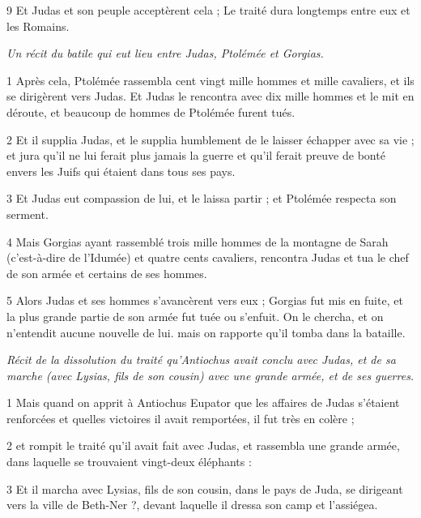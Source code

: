 \par 9 Et Judas et son peuple acceptèrent cela ; Le traité dura longtemps entre eux et les Romains.


\par \textit{Un récit du batile qui eut lieu entre Judas, Ptolémée et Gorgias.}

\par 1 Après cela, Ptolémée rassembla cent vingt mille hommes et mille cavaliers, et ils se dirigèrent vers Judas. Et Judas le rencontra avec dix mille hommes et le mit en déroute, et beaucoup de hommes de Ptolémée furent tués.

\par 2 Et il supplia Judas, et le supplia humblement de le laisser échapper avec sa vie ; et jura qu'il ne lui ferait plus jamais la guerre et qu'il ferait preuve de bonté envers les Juifs qui étaient dans tous ses pays.

\par 3 Et Judas eut compassion de lui, et le laissa partir ; et Ptolémée respecta son serment.

\par 4 Mais Gorgias ayant rassemblé trois mille hommes de la montagne de Sarah (c'est-à-dire de l'Idumée) et quatre cents cavaliers, rencontra Judas et tua le chef de son armée et certains de ses hommes.

\par 5 Alors Judas et ses hommes s'avancèrent vers eux ; Gorgias fut mis en fuite, et la plus grande partie de son armée fut tuée ou s'enfuit. On le chercha, et on n'entendit aucune nouvelle de lui. mais on rapporte qu'il tomba dans la bataille.


\par \textit{Récit de la dissolution du traité qu'Antiochus avait conclu avec Judas, et de sa marche (avec Lysias, fils de son cousin) avec une grande armée, et de ses guerres.}

\par 1 Mais quand on apprit à Antiochus Eupator que les affaires de Judas s'étaient renforcées et quelles victoires il avait remportées, il fut très en colère ;

\par 2 et rompit le traité qu'il avait fait avec Judas, et rassembla une grande armée, dans laquelle se trouvaient vingt-deux éléphants :

\par 3 Et il marcha avec Lysias, fils de son cousin, dans le pays de Juda, se dirigeant vers la ville de Beth-Ner ?, devant laquelle il dressa son camp et l'assiégea.

